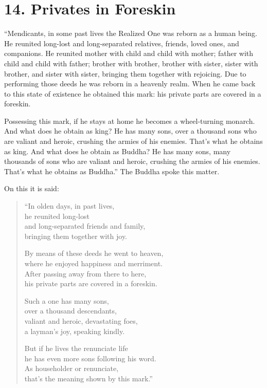 \documentclass[12pt,openany]{book}%
\begin{document}
\section*{14. Privates in Foreskin }

“Mendicants, in some past lives the Realized One was reborn as a human being. He reunited long-lost and long-separated relatives, friends, loved ones, and companions. He reunited mother with child and child with mother; father with child and child with father; brother with brother, brother with sister, sister with brother, and sister with sister, bringing them together with rejoicing. Due to performing those deeds he was reborn in a heavenly realm. When he came back to this state of existence he obtained this mark: his private parts are covered in a foreskin. 

Possessing this mark, if he stays at home he becomes a wheel-turning monarch. And what does he obtain as king? He has many sons, over a thousand sons who are valiant and heroic, crushing the armies of his enemies. That’s what he obtains as king. And what does he obtain as Buddha? He has many sons, many thousands of sons who are valiant and heroic, crushing the armies of his enemies. That’s what he obtains as Buddha.” The Buddha spoke this matter. 

On this it is said: 

\begin{verse}%
“In olden days, in past lives, \\
he reunited long-lost \\
and long-separated friends and family, \\
bringing them together with joy. 

By means of these deeds he went to heaven, \\
where he enjoyed happiness and merriment. \\
After passing away from there to here, \\
his private parts are covered in a foreskin. 

Such a one has many sons, \\
over a thousand descendants, \\
valiant and heroic, devastating foes, \\
a layman’s joy, speaking kindly. 

But if he lives the renunciate life \\
he has even more sons following his word. \\
As householder or renunciate, \\
that’s the meaning shown by this mark.” 

%
\end{verse}
\end{document}
